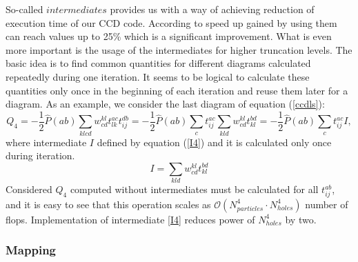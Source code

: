 \documentclass[twoside,english]{uiofysmaster}
\begin{document}
So-called $intermediates$ provides us with a way of achieving reduction of execution time of our CCD code.
According to \cite{MillerQuantumMechanicalStudies2017} speed up gained by using them can reach values up to 25\% which is a significant improvement. What is even more important is the usage of the intermediates for higher truncation levels.
The basic idea is to find common quantities for different diagrams calculated repeatedly during one iteration. It seems to be logical to calculate these quantities only once in the beginning of each iteration and reuse them later for a diagram. As an example, we consider the last diagram of equation (\ref{ccdls}):
\begin{equation}
	Q_4 = -\frac{1}{2}\hat{P}(ab)\sum_{klcd}w_{cd}^{kl}t_{lk}^{ac}t_{ij}^{db} = -\frac{1}{2}\hat{P}(ab) \sum_{c} t_{ij}^{ac} \sum_{kld} w_{cd}^{kl} t_{kl}^{bd} = -\frac{1}{2}\hat{P}(ab) \sum_{c} t_{ij}^{ac} I,
\end{equation}
where intermediate $I$ defined by equation (\ref{I4}) and it is calculated only once during iteration.
\begin{equation}\label{I4}
	I = \sum_{kld} w_{cd}^{kl} t_{kl}^{bd}
\end{equation}
Considered $Q_4$ computed without intermediates must be calculated for all $t_{ij}^{ab}$, and it is easy to see that this operation scales as $\mathcal{O} (N_{particles}^4\cdot N_{holes}^4)$ number of flops. Implementation of intermediate \ref{I4} reduces power of $N_{holes}^4$ by two.

\subsubsection{Mapping}
\end{document}
